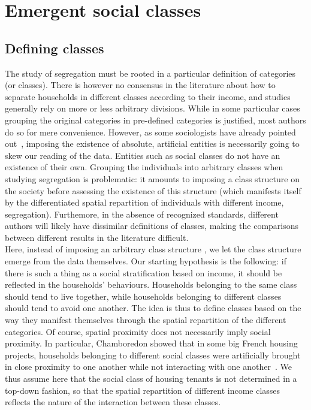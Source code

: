 \section{Emergent social classes}
\label{sec:the_emergent_social_classes}

\subsection{Defining classes}
\label{sub:defining_classes}


The study of segregation must be rooted in a particular definition of categories
(or classes). There is however no consensus in the literature about how to
separate households in different classes according to their income, and studies
generally rely on more or less arbitrary divisions. While in some particular
cases grouping the original categories in pre-defined categories is justified,
most authors do so for mere convenience. However, as some sociologists
have already pointed out~\cite{Emirbayer:1997}, imposing the existence of
absolute, artificial entities is necessarily going to skew our reading of the
data. Entities such as social classes do not have an existence of their own.
Grouping the individuals into arbitrary classes when studying segregation is
problematic: it amounts to imposing a class structure on the society before
assessing the existence of this structure (which manifests itself by the
differentiated spatial repartition of individuals with different income,
segregation).
Furthemore, in the absence of recognized standards, different authors will
likely have dissimilar definitions of classes, making the comparisons between
different results in the literature difficult.\\

Here, instead of imposing an arbitrary class structure , we let the class
structure emerge from the data themselves. Our starting hypothesis is the
following: if there is such a thing as a social stratification based on income,
it should be reflected in the households' behaviours. Households belonging to
the same class should tend to live together, while households belonging to
different classes should tend to avoid one another. The idea is thus to define
classes based on the way they manifest themselves through the spatial
repartition of the different categories. Of course, spatial proximity does not
necessarily imply social proximity. In particular, Chamboredon showed that in
some big French housing projects, households belonging to different social
classes were artificially brought in close proximity to one another while not
interacting with one another~\cite{Chamboredon:1970}. We thus assume
here that the social class of housing tenants is not determined in a top-down
fashion, so that the spatial repartition of different income classes reflects
the nature of the interaction between these classes.


